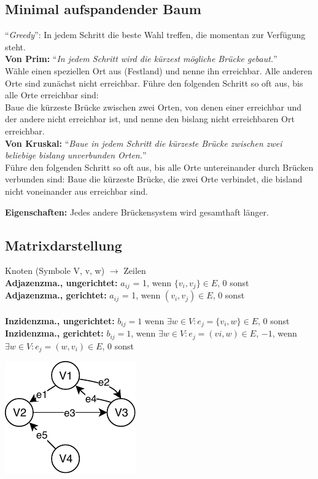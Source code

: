 \documentclass[8pt,landscape]{scrartcl}
\begin{document}
\begin{multicols}{3}
\subsection{Minimal aufspandender Baum}

``\textit{Greedy}'': In jedem Schritt die beste Wahl treffen, die momentan zur Verf\"ugung steht.\\

\textbf{Von Prim:} ``\textit{In jedem Schritt wird die k\"urzest m\"ogliche Br\"ucke gebaut.}''\\
W\"ahle einen speziellen Ort aus (Festland) und nenne ihn erreichbar.
Alle anderen Orte sind zun\"achst nicht erreichbar.
F\"uhre den folgenden Schritt so oft aus, bis alle Orte erreichbar sind:\\
Baue die k\"urzeste Br\"ucke zwischen zwei Orten, von denen einer erreichbar und der andere nicht erreichbar ist, und nenne den bislang nicht erreichbaren Ort erreichbar.\\

\textbf{Von Kruskal:} ``\textit{Baue in jedem Schritt die k\"urzeste Br\"ucke zwischen zwei beliebige bislang unverbunden Orten.}''\\
F\"uhre den folgenden Schritt so oft aus, bis alle Orte untereinander durch Br\"ucken verbunden sind: Baue die k\"urzeste Br\"ucke, die zwei Orte verbindet, die bisland nicht voneinander aus erreichbar sind.

\textbf{Eigenschaften:} Jedes andere Br\"uckensystem wird gesamthaft l\"anger.



\subsection{Matrixdarstellung}
Knoten (Symbole V, v, w) $\rightarrow$ Zeilen\\
\textbf{Adjazenzma., ungerichtet:} $a_{ij}$ = 1, wenn $\{v_i, v_j\} \in E$, 0 sonst\\
\textbf{Adjazenzma., gerichtet:} $a_{ij}$ = 1, wenn $(v_i, v_j) \in E$, 0 sonst\\\\ 
\textbf{Inzidenzma., ungerichtet:} $b_{ij} = 1$ wenn $\exists w \in V: e_j = \{v_i, w \} \in E$, 0 sonst\\
\textbf{Inzidenzma., gerichtet:} $b_{ij} = 1$, wenn $\exists w \in V : e_j = (vi, w) \in E$, $-1$, wenn $\exists w \in V: e_j = (w, v_i) \in E$, 0 sonst

\includegraphics[width=0.5\linewidth]{inzidenz.pdf}


\end{multicols}
\end{document}
